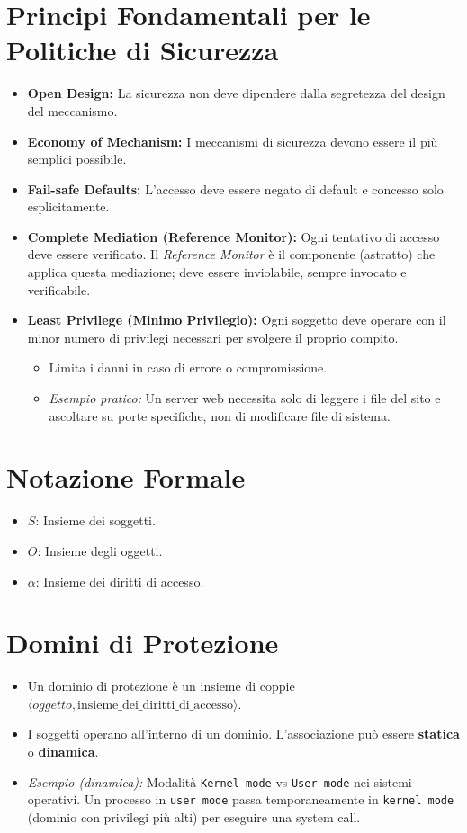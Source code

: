 \documentclass{article}
\begin{document}
\section{Principi Fondamentali per le Politiche di Sicurezza}
\begin{itemize}
    \item \textbf{Open Design:} La sicurezza non deve dipendere dalla segretezza del design del meccanismo.
    \item \textbf{Economy of Mechanism:} I meccanismi di sicurezza devono essere il più semplici possibile.
    \item \textbf{Fail-safe Defaults:} L'accesso deve essere negato di default e concesso solo esplicitamente.
    \item \textbf{Complete Mediation (Reference Monitor):} Ogni tentativo di accesso deve essere verificato. Il \textit{Reference Monitor} è il componente (astratto) che applica questa mediazione; deve essere inviolabile, sempre invocato e verificabile.
    \item \textbf{Least Privilege (Minimo Privilegio):} Ogni soggetto deve operare con il minor numero di privilegi necessari per svolgere il proprio compito.
        \begin{itemize}
            \item Limita i danni in caso di errore o compromissione.
            \item \textit{Esempio pratico:} Un server web necessita solo di leggere i file del sito e ascoltare su porte specifiche, non di modificare file di sistema.
        \end{itemize}
\end{itemize}

\section{Notazione Formale}
\begin{itemize}
    \item $S$: Insieme dei soggetti.
    \item $O$: Insieme degli oggetti.
    \item $\alpha$: Insieme dei diritti di accesso.
\end{itemize}

\section{Domini di Protezione}
\begin{itemize}
    \item Un dominio di protezione è un insieme di coppie $\langle oggetto, \text{insieme\_dei\_diritti\_di\_accesso} \rangle$.
    \item I soggetti operano all'interno di un dominio. L'associazione può essere \textbf{statica} o \textbf{dinamica}.
    \item \textit{Esempio (dinamica):} Modalità \texttt{Kernel mode} vs \texttt{User mode} nei sistemi operativi. Un processo in \texttt{user mode} passa temporaneamente in \texttt{kernel mode} (dominio con privilegi più alti) per eseguire una system call.
\end{itemize}
\end{document}
